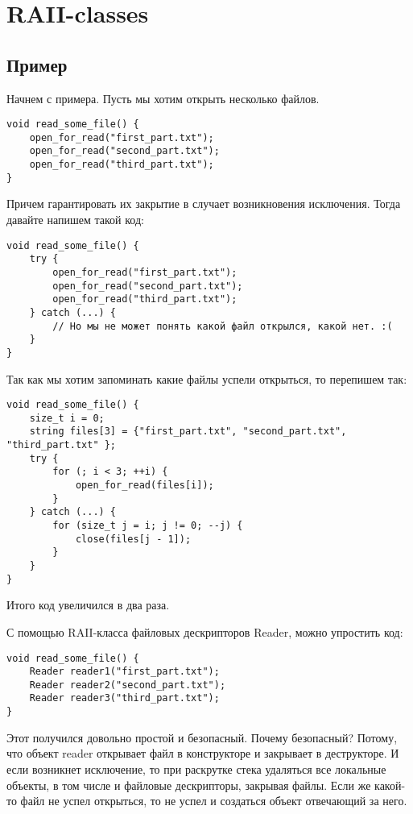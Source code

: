 \section{RAII-classes}
\subsection{Пример}
Начнем с примера. Пусть мы хотим открыть несколько файлов.

\begin{verbatim}
void read_some_file() {
    open_for_read("first_part.txt");
    open_for_read("second_part.txt");
    open_for_read("third_part.txt");
}
\end{verbatim}


Причем гарантировать их закрытие в случает возникновения исключения.
Тогда давайте напишем такой код:
\begin{verbatim}
void read_some_file() {
    try {
        open_for_read("first_part.txt");
        open_for_read("second_part.txt");
        open_for_read("third_part.txt");
    } catch (...) {
        // Но мы не может понять какой файл открылся, какой нет. :(
    }
}
\end{verbatim}

Так как мы хотим запоминать какие файлы успели открыться, то перепишем так:

\begin{verbatim}
void read_some_file() {
    size_t i = 0;
    string files[3] = {"first_part.txt", "second_part.txt", "third_part.txt" };
    try {
        for (; i < 3; ++i) {
            open_for_read(files[i]);
        }
    } catch (...) {
        for (size_t j = i; j != 0; --j) {
            close(files[j - 1]);
        }
    }
}
\end{verbatim}

Итого код увеличился в два раза.

С помощью RAII-класса файловых дескрипторов Reader, можно упростить код:

\begin{verbatim}
void read_some_file() {
    Reader reader1("first_part.txt");
    Reader reader2("second_part.txt");
    Reader reader3("third_part.txt");
}
\end{verbatim}

Этот получился довольно простой и безопасный. Почему безопасный? Потому, что объект reader открывает файл в конструкторе и закрывает в деструкторе. И если возникнет исключение, то при раскрутке стека удаляться все локальные объекты, в том числе и файловые дескрипторы, закрывая файлы. Если же какой-то файл не успел открыться, то не успел и создаться объект отвечающий за него.

